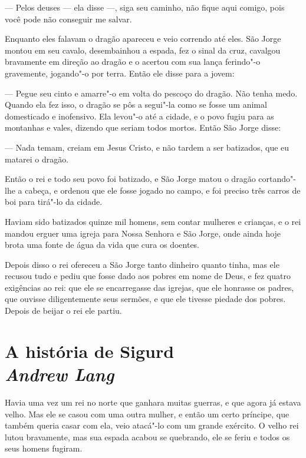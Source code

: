 --- Pelos deuses --- ela disse ---, siga seu caminho, não fique aqui comigo,
pois você pode não conseguir me salvar.

Enquanto eles falavam o dragão apareceu e veio correndo até eles. São
Jorge montou em seu cavalo, desembainhou a espada, fez o sinal da
cruz, cavalgou bravamente em direção ao dragão e o acertou com sua
lança ferindo"-o gravemente, jogando"-o por terra. Então ele disse para
a jovem:

--- Pegue seu cinto e amarre"-o em volta do pescoço do dragão. Não tenha
medo. Quando ela fez isso, o dragão se pôs a segui"-la como se fosse um
animal domesticado e inofensivo. Ela levou"-o até a cidade, e o povo
fugiu para as montanhas e vales, dizendo que seriam todos mortos.
Então São Jorge disse: 

--- Nada temam, creiam em Jesus Cristo, e não tardem a ser batizados,
que eu matarei o dragão. 

Então o rei e todo seu povo foi batizado, e São Jorge matou o dragão
cortando"-lhe a cabeça, e ordenou que ele fosse jogado no campo, e foi
preciso três carros de boi para tirá"-lo da cidade. 

Haviam sido batizados quinze mil homens, sem contar mulheres e
crianças, e o rei mandou erguer uma igreja para Nossa Senhora e São
Jorge, onde ainda hoje brota uma fonte de água da vida que cura os
doentes.

Depois disso o rei ofereceu a São Jorge tanto dinheiro quanto tinha,
mas ele recusou tudo e pediu que fosse dado aos pobres em nome de
Deus, e fez quatro exigências ao rei: que ele se encarregasse
das igrejas, que ele honrasse os padres, que ouvisse diligentemente
seus sermões, e que ele tivesse piedade dos pobres. Depois de
beijar o rei ele partiu.

\chapter[A história de Sigurd\\{\itshape Andrew Lang}]{A história de Sigurd\\{\LARGE\itshape Andrew Lang}}

Havia uma vez um rei no norte que ganhara muitas guerras, e que agora
já estava velho. Mas ele se casou com uma outra mulher, e então um
certo príncipe, que também queria casar com ela, veio atacá"-lo com um
grande exército. O velho rei lutou bravamente, mas sua espada acabou
se quebrando, ele se feriu e todos os seus homens fugiram. 

